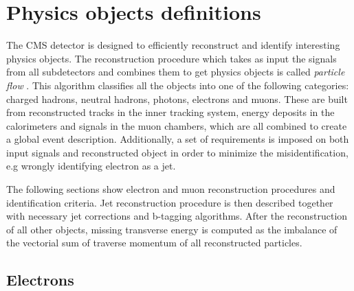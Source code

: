\chapter{Physics objects definitions} %

\label{Chapter5} %


The CMS detector is designed to efficiently reconstruct and identify interesting physics objects. The reconstruction procedure which takes as input the signals from all subdetectors and combines them to get physics objects is called \textit{particle flow} \cite{CMS:2009nxa}. This algorithm classifies all the objects into one of the following categories: charged hadrons, neutral hadrons, photons, electrons and muons. These are built from reconstructed tracks in the inner tracking system, energy deposits in the calorimeters and signals in the muon chambers, which are all combined to create a global event description. Additionally, a set of requirements is imposed on both input signals and reconstructed object in order to minimize the misidentification, e.g wrongly identifying electron as a jet. 
\par The following sections show electron and muon reconstruction procedures and identification criteria. Jet reconstruction procedure is then described together with necessary jet corrections and b-tagging algorithms. After the reconstruction of all other objects, missing transverse energy is computed as the imbalance of the vectorial sum of traverse momentum of all reconstructed particles.


\section{Electrons}

